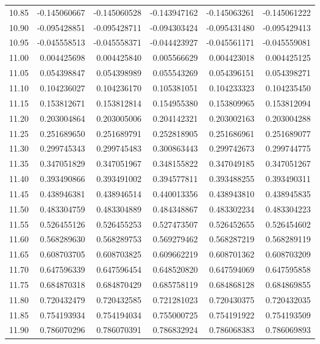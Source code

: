 \documentclass[11pt,a4paper]{article}
\begin{document}
\begin{longtable}{rrrrrr}
10.85 & -0.145060667 & -0.145060528 & -0.143947162 & -0.145063261 & -0.145061222 \\
10.90 & -0.095428851 & -0.095428711 & -0.094303424 & -0.095431480 & -0.095429413 \\
10.95 & -0.045558513 & -0.045558371 & -0.044423927 & -0.045561171 & -0.045559081 \\
11.00 & 0.004425698 & 0.004425840 & 0.005566629 & 0.004423018 & 0.004425125 \\
11.05 & 0.054398847 & 0.054398989 & 0.055543269 & 0.054396151 & 0.054398271 \\
11.10 & 0.104236027 & 0.104236170 & 0.105381051 & 0.104233323 & 0.104235450 \\
11.15 & 0.153812671 & 0.153812814 & 0.154955380 & 0.153809965 & 0.153812094 \\
11.20 & 0.203004864 & 0.203005006 & 0.204142321 & 0.203002163 & 0.203004288 \\
11.25 & 0.251689650 & 0.251689791 & 0.252818905 & 0.251686961 & 0.251689077 \\
11.30 & 0.299745343 & 0.299745483 & 0.300863443 & 0.299742673 & 0.299744775 \\
11.35 & 0.347051829 & 0.347051967 & 0.348155822 & 0.347049185 & 0.347051267 \\
11.40 & 0.393490866 & 0.393491002 & 0.394577811 & 0.393488255 & 0.393490311 \\
11.45 & 0.438946381 & 0.438946514 & 0.440013356 & 0.438943810 & 0.438945835 \\
11.50 & 0.483304759 & 0.483304889 & 0.484348867 & 0.483302234 & 0.483304223 \\
11.55 & 0.526455126 & 0.526455253 & 0.527473507 & 0.526452655 & 0.526454602 \\
11.60 & 0.568289630 & 0.568289753 & 0.569279462 & 0.568287219 & 0.568289119 \\
11.65 & 0.608703705 & 0.608703825 & 0.609662219 & 0.608701362 & 0.608703209 \\
11.70 & 0.647596339 & 0.647596454 & 0.648520820 & 0.647594069 & 0.647595858 \\
11.75 & 0.684870318 & 0.684870429 & 0.685758119 & 0.684868128 & 0.684869855 \\
11.80 & 0.720432479 & 0.720432585 & 0.721281023 & 0.720430375 & 0.720432035 \\
11.85 & 0.754193934 & 0.754194034 & 0.755000725 & 0.754191922 & 0.754193509 \\
11.90 & 0.786070296 & 0.786070391 & 0.786832924 & 0.786068383 & 0.786069893 \\

\end{longtable}
\end{document}
